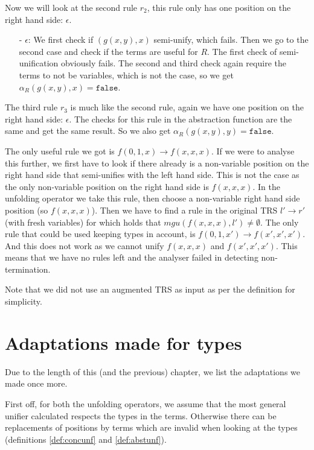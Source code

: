 Now we will look at the second rule $r_2$, this rule only has one position on the right hand side: $\epsilon$.
\begin{itemize}
    \itemsep 0em
    \item[-] $\epsilon$: We first check if $(g(x, y), x)$ semi-unify, which fails. Then we go to the second case and check if the terms are useful for $R$. The first check of semi-unification obviously fails. The second and third check again require the terms to not be variables, which is not the case, so we get $\alpha_R(g(x,y), x) = \texttt{false}$.
\end{itemize}
The third rule $r_3$ is much like the second rule, again we have one position on the right hand side: $\epsilon$. The checks for this rule in the abstraction function are the same and get the same result. So we also get $\alpha_R(g(x,y), y) = \texttt{false}$.

\noindent The only useful rule we got is $f(0, 1, x) \rightarrow f(x,x,x)$. If we were to analyse this further, we first have to look if there already is a non-variable position on the right hand side that semi-unifies with the left hand side. This is not the case as the only non-variable position on the right hand side is $f(x, x, x)$. In the unfolding operator we take this rule, then choose a non-variable right hand side position (so $f(x,x,x)$). Then we have to find a rule in the original TRS $l' \rightarrow r'$ (with fresh variables) for which holds that $\textit{mgu}(f(x,x,x), l') \neq \emptyset$. The only rule that could be used keeping types in account, is $f(0, 1, x') \rightarrow f(x', x', x')$. And this does not work as we cannot unify $f(x,x,x)$ and $f(x', x', x')$. This means that we have no rules left and the analyser failed in detecting non-termination. 

Note that we did not use an augmented TRS as input as per the definition for simplicity. 

\section{Adaptations made for types}
Due to the length of this (and the previous) chapter, we list the adaptations we made once more.  

First off, for both the unfolding operators, we assume that the most general unifier calculated respects the types in the terms. Otherwise there can be replacements of positions by terms which are invalid when looking at the types (definitions \ref{def:concunf} and \ref{def:abstunf}).


